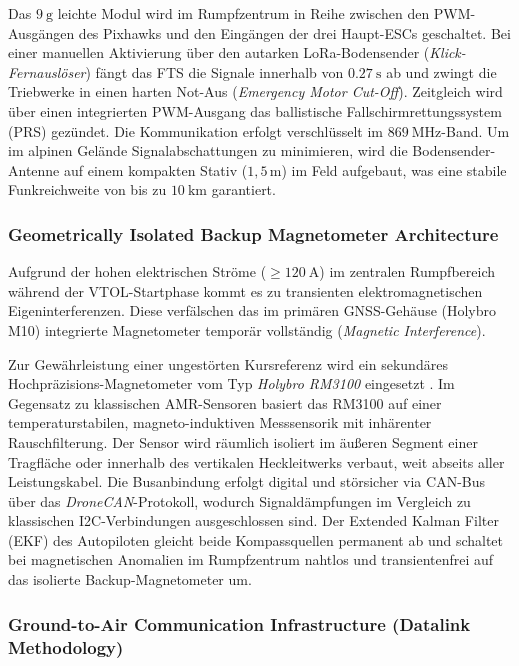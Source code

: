 Das $\SI{9}{\g}$ leichte Modul wird im Rumpfzentrum in Reihe zwischen den PWM-Ausgängen des Pixhawks und den Eingängen der drei Haupt-ESCs geschaltet. Bei einer manuellen Aktivierung über den autarken LoRa-Bodensender 
(\textit{Klick-Fernauslöser}) fängt das FTS die Signale innerhalb von $\SI{0.27}{\s}$ ab und zwingt die Triebwerke in einen harten Not-Aus (\textit{Emergency Motor Cut-Off}). Zeitgleich wird über einen integrierten PWM-Ausgang 
das ballistische Fallschirmrettungssystem (PRS) gezündet. Die Kommunikation erfolgt verschlüsselt im $\SI{869}{\MHz}$-Band. Um im alpinen Gelände Signalabschattungen zu minimieren, wird die Bodensender-Antenne auf einem kompakten 
Stativ ($1{,}5\,\text{m}$) im Feld aufgebaut, was eine stabile Funkreichweite von bis zu $\SI{10}{\km}$ garantiert.

\subsubsection{Geometrically Isolated Backup Magnetometer Architecture}
\label{sec:isolated_magnetometer}

Aufgrund der hohen elektrischen Ströme ($\ge \SI{120}{\A}$) im zentralen Rumpfbereich während der VTOL-Startphase kommt es zu transienten elektromagnetischen Eigeninterferenzen. Diese verfälschen das im primären GNSS-Gehäuse (Holybro M10) integrierte Magnetometer temporär vollständig (\textit{Magnetic Interference}). 

Zur Gewährleistung einer ungestörten Kursreferenz wird ein sekundäres Hochpräzisions-Magnetometer vom Typ \textit{Holybro RM3100} eingesetzt \cite{holybro_RM3100}. Im Gegensatz zu klassischen AMR-Sensoren basiert das RM3100 auf einer 
temperaturstabilen, magneto-induktiven Messsensorik mit inhärenter Rauschfilterung. Der Sensor wird räumlich isoliert im äußeren Segment einer Tragfläche oder innerhalb des vertikalen Heckleitwerks verbaut, weit abseits aller Leistungskabel. 
Die Busanbindung erfolgt digital und störsicher via CAN-Bus über das \textit{DroneCAN}-Protokoll, wodurch Signaldämpfungen im Vergleich zu klassischen I2C-Verbindungen ausgeschlossen sind. Der Extended Kalman Filter (EKF) des Autopiloten gleicht beide 
Kompassquellen permanent ab und schaltet bei magnetischen Anomalien im Rumpfzentrum nahtlos und transientenfrei auf das isolierte Backup-Magnetometer um.

\subsubsection{Ground-to-Air Communication Infrastructure (Datalink Methodology)}
\label{sec:ground_to_air_communication}


